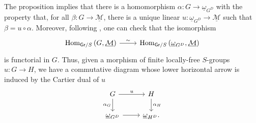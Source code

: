 \begin{rem}[]\label{rem:ReprMorExt}
	The proposition implies that there is
	a homomorphism $\alpha\colon G \to \underline{\omega}_{G^D}$
	with the property that, for all $\beta\colon G \to \underline{\mathcal{M}}$,
	there is a unique linear $u\colon \underline{\omega}_{G^D} \to \underline{\mathcal{M}}$
	such that $\beta = u \circ \alpha$.
	Moreover, following {\cite[Chapter IV, remark 1.6]{Messing}},
	one can check that the isomorphism
	\begin{equation*}
	\begin{tikzcd}[row sep = 0ex
		,/tikz/column 1/.append style={anchor=base east}
		,/tikz/column 2/.append style={anchor=base west}]
		\mathrm{Hom}_{\mathsf{Gr}/S} \left( G, \underline{\mathcal{M}} \right)
		\arrow[r, "\sim", rightarrow] &
		\mathrm{Hom}_{\mathsf{Gr}/S} \left( \underline{\omega}_{G^D}, \underline{\mathcal{M}} \right)
	\end{tikzcd}
	\end{equation*} 
	is functorial in $G$.
	Thus, given a morphism of finite locally-free $S$-groups $u\colon G \to H$,
	we have a commutative diagram whose lower horizontal arrow is
	induced by the Cartier dual of $u$
	\begin{equation}\label{diag:functorialityRepresent}
	\begin{tikzcd}
		G \arrow[r, "u", rightarrow] 
		\arrow[d, "\alpha_G"', rightarrow] &
		H \arrow[d, "\alpha_H", rightarrow] \\
		\underline{\omega}_{G^D} \arrow[r, "", rightarrow] &
		\underline{\omega}_{H^D}
	.\end{tikzcd}
	\end{equation}
\end{rem}


